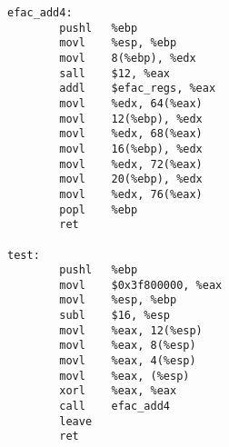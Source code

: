\begin{lstlisting}[float=ht,caption={x86 not inlined (gcc -S -m32 -O3 -fno-inline)},label={lst:noinline32}]
efac_add4:
        pushl   %ebp
        movl    %esp, %ebp
        movl    8(%ebp), %edx
        sall    $12, %eax
        addl    $efac_regs, %eax
        movl    %edx, 64(%eax)
        movl    12(%ebp), %edx
        movl    %edx, 68(%eax)
        movl    16(%ebp), %edx
        movl    %edx, 72(%eax)
        movl    20(%ebp), %edx
        movl    %edx, 76(%eax)
        popl    %ebp
        ret

test:
        pushl   %ebp
        movl    $0x3f800000, %eax
        movl    %esp, %ebp
        subl    $16, %esp
        movl    %eax, 12(%esp)
        movl    %eax, 8(%esp)
        movl    %eax, 4(%esp)
        movl    %eax, (%esp)
        xorl    %eax, %eax
        call    efac_add4
        leave
        ret
\end{lstlisting}
